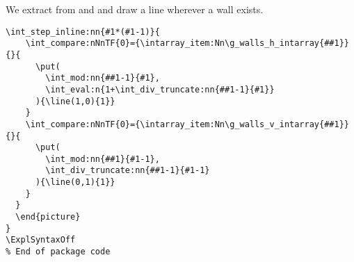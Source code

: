 \documentclass{ltxdoc}
\begin{document}
We extract from  and  and draw a line wherever a wall exists.
\begin{lstlisting}[firstnumber=last]
  \int_step_inline:nn{#1*(#1-1)}{
    \int_compare:nNnTF{0}={\intarray_item:Nn\g_walls_h_intarray{##1}}{}{
      \put(
        \int_mod:nn{##1-1}{#1},
        \int_eval:n{1+\int_div_truncate:nn{##1-1}{#1}}
      ){\line(1,0){1}}
    }
    \int_compare:nNnTF{0}={\intarray_item:Nn\g_walls_v_intarray{##1}}{}{
      \put(
        \int_mod:nn{##1}{#1-1},
        \int_div_truncate:nn{##1-1}{#1-1}
      ){\line(0,1){1}}
    }
  }
  \end{picture}
}
\ExplSyntaxOff
% End of package code
\end{lstlisting}
\end{document}
